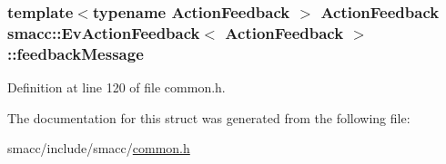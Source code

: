 \subsubsection[{\texorpdfstring{feedback\+Message}{feedbackMessage}}]{\setlength{\rightskip}{0pt plus 5cm}template$<$typename Action\+Feedback $>$ Action\+Feedback {\bf smacc\+::\+Ev\+Action\+Feedback}$<$ Action\+Feedback $>$\+::feedback\+Message}\hypertarget{structsmacc_1_1EvActionFeedback_a9e15b2862ee4e7c2e12407cfb3caa800}{}\label{structsmacc_1_1EvActionFeedback_a9e15b2862ee4e7c2e12407cfb3caa800}


Definition at line 120 of file common.\+h.



The documentation for this struct was generated from the following file\+:\begin{DoxyCompactItemize}
\item 
smacc/include/smacc/\hyperlink{common_8h}{common.\+h}\end{DoxyCompactItemize}
